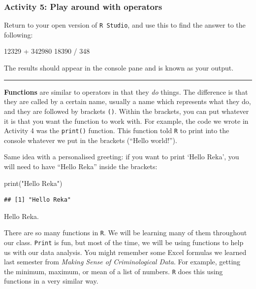 \documentclass[
]{book}
\newenvironment{Shaded}{\begin{snugshade}}{\end{snugshade}}
\newcommand{\DecValTok}[1]{\textcolor[rgb]{0.00,0.00,0.81}{#1}}
\newcommand{\FunctionTok}[1]{\textcolor[rgb]{0.00,0.00,0.00}{#1}}
\newcommand{\NormalTok}[1]{#1}
\newcommand{\SpecialCharTok}[1]{\textcolor[rgb]{0.00,0.00,0.00}{#1}}
\newcommand{\StringTok}[1]{\textcolor[rgb]{0.31,0.60,0.02}{#1}}
\begin{document}
\hypertarget{activity-5-play-around-with-operators}{%
\subsubsection{Activity 5: Play around with operators}\label{activity-5-play-around-with-operators}}

Return to your open version of \texttt{R\ Studio}, and use this to find the answer to the following:

\begin{Shaded}
\begin{Highlighting}[]
\DecValTok{12329} \SpecialCharTok{+} \DecValTok{342980}
\DecValTok{18390} \SpecialCharTok{/} \DecValTok{348}
\end{Highlighting}
\end{Shaded}

The results should appear in the console pane and is known as your output.

\begin{center}\rule{0.5\linewidth}{0.5pt}\end{center}

\textbf{Functions} are similar to operators in that they \emph{do} things. The difference is that they are called by a certain name, usually a name which represents what they do, and they are followed by brackets \texttt{()}. Within the brackets, you can put whatever it is that you want the function to work with. For example, the code we wrote in Activity 4 was the \texttt{print()} function. This function told \texttt{R} to print into the console whatever we put in the brackets (``Hello world!'').

Same idea with a personalised greeting: if you want to print `Hello Reka', you will need to have ``Hello Reka'' inside the brackets:

\begin{Shaded}
\begin{Highlighting}[]
\FunctionTok{print}\NormalTok{(}\StringTok{"Hello Reka"}\NormalTok{)}
\end{Highlighting}
\end{Shaded}

\begin{verbatim}
## [1] "Hello Reka"
\end{verbatim}

Hello Reka.

There are so many functions in \texttt{R}. We will be learning many of them throughout our class. \texttt{Print} is fun, but most of the time, we will be using functions to help us with our data analysis. You might remember some Excel formulas we learned last semester from \emph{Making Sense of Criminological Data}. For example, getting the minimum, maximum, or mean of a list of numbers. \texttt{R} does this using functions in a very similar way.
\end{document}
